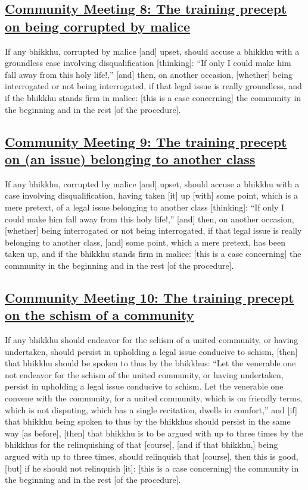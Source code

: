 \subsection*{\hyperref[sd8]{Community Meeting 8: The training precept on being corrupted by malice}}
\label{comm8}
If any bhikkhu, corrupted by malice [and] upset, should accuse a bhikkhu with a groundless case involving disqualification [thinking]: ``If only I could make him fall away from this holy life!,'' [and] then, on another occasion, [whether] being interrogated or not being interrogated, if that legal issue is really groundless, and if the bhikkhu stands firm in malice: [this is a case concerning] the community in the beginning and in the rest [of the procedure].

\subsection*{\hyperref[sd9]{Community Meeting 9: The training precept on (an issue) belonging to another class}}
\label{comm9}
If any bhikkhu, corrupted by malice [and] upset, should accuse a bhikkhu with a case involving disqualification, having taken [it] up [with] some point, which is a mere pretext, of a legal issue belonging to another class [thinking]: ``If only I could make him fall away from this holy life!,'' [and] then, on another occasion, [whether] being interrogated or not being interrogated, if that legal issue is really belonging to another class, [and] some point, which a mere pretext, has been taken up, and if the bhikkhu stands firm in malice: [this is a case concerning] the community in the beginning and in the rest [of the procedure].

\subsection*{\hyperref[sd10]{Community Meeting 10: The training precept on the schism of a community}}
\label{comm10}
If any bhikkhu should endeavor for the schism of a united community, or having undertaken, should persist in upholding a legal issue conducive to schism, [then] that bhikkhu should be spoken to thus by the bhikkhus: ``Let the venerable one not endeavor for the schism of the united community, or having undertaken, persist in upholding a legal issue conducive to schism. Let the venerable one convene with the community, for a united community, which is on friendly terms, which is not disputing, which has a single recitation, dwells in comfort,'' and [if] that bhikkhu being spoken to thus by the bhikkhus should persist in the same way [as before], [then] that bhikkhu is to be argued with up to three times by the bhikkhus for the relinquishing of that [course], [and if that bhikkhu,] being argued with up to three times, should relinquish that [course], then this is good, [but] if he should not relinquish [it]: [this is a case concerning] the community in the beginning and in the rest [of the procedure].

